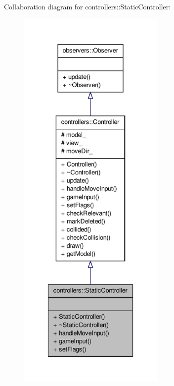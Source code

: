 \-Collaboration diagram for controllers\-:\-:\-Static\-Controller\-:
\nopagebreak
\begin{figure}[H]
\begin{center}
\leavevmode
\includegraphics[height=550pt]{de/d96/classcontrollers_1_1StaticController__coll__graph}
\end{center}
\end{figure}
